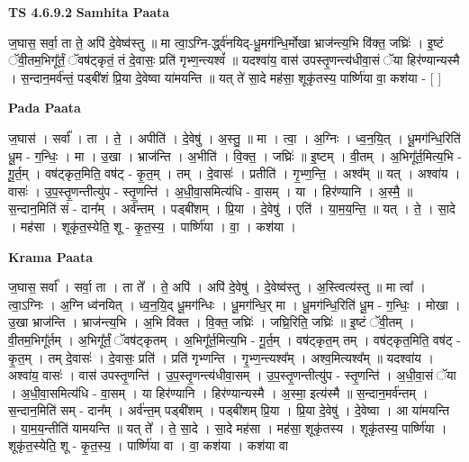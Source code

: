 \documentclass[17pt]{extarticle}
\begin{document}
\textbf{TS 4.6.9.2 } \newline
\textbf{Samhita Paata} \newline

ज॒घास॒ सर्वा॒ ता ते॒ अपि॑ दे॒वेष्व॑स्तु ॥ मा त्वा॒ऽग्नि-र्द्ध्व॑नयिद्-धू॒मग॑न्धि॒र्मोखा भ्राज॑न्त्य॒भि वि॑क्त॒ जघ्रिः॑ । इ॒ष्टं ॅवी॒तम॒भिगू᳚र्तं॒ ॅवष॑ट्कृतं॒ तं दे॒वासः॒ प्रति॑ गृभ्ण॒न्त्यश्वं᳚ ॥ यदश्वा॑य॒ वास॑ उपस्तृ॒णन्त्य॑धीवा॒सं ॅया हिर॑ण्यान्यस्मै । स॒न्दान॒मर्व॑न्तं॒ पड्बी॑शं प्रि॒या दे॒वेष्वा या॑मयन्ति ॥ यत् ते॑ सा॒दे मह॑सा॒ शूकृ॑तस्य॒ पार्ष्णि॑या वा॒ कश॑या - [  ] \newline

\textbf{Pada Paata} \newline

ज॒घास॑ । सर्वा᳚ । ता । ते॒ । अपीति॑ । दे॒वेषु॑ । अ॒स्तु॒ ॥ मा । त्वा॒ । अ॒ग्निः । ध्व॒न॒यि॒त् । धू॒मग॑न्धि॒रिति॑ धू॒म - ग॒न्धिः॒ । मा । उ॒खा । भ्राज॑न्ति । अ॒भीति॑ । वि॒क्त॒ । जघ्रिः॑ ॥ इ॒ष्टम् । वी॒तम् । अ॒भिगू᳚र्त॒मित्य॒भि - गू॒र्त॒म् । वष॑ट्कृत॒मिति॒ वष॑ट् - कृ॒त॒म् । तम् । दे॒वासः॑ । प्रतीति॑ । गृ॒भ्ण॒न्ति॒ । अश्व᳚म् ॥ यत् । अश्वा॑य । वासः॑ । उ॒प॒स्तृ॒णन्तीत्यु॑प - स्तृ॒णन्ति॑ । अ॒धी॒वा॒समित्य॑धि - वा॒सम् । या । हिर॑ण्यानि । अ॒स्मै॒ ॥ स॒न्दान॒मिति॑ सं - दान᳚म् । अर्व॑न्तम् । पड्बी॑शम् । प्रि॒या । दे॒वेषु॑ । एति॑ । या॒म॒य॒न्ति॒ ॥ यत् । ते॒ । सा॒दे । मह॑सा । शूकृ॑त॒स्येति॒ शू - कृ॒त॒स्य॒ । पार्ष्णि॑या । वा॒ । कश॑या ।  \newline


\textbf{Krama Paata} \newline

ज॒घास॒ सर्वा᳚ । सर्वा॒ ता । ता ते᳚ । ते॒ अपि॑ । अपि॑ दे॒वेषु॑ । दे॒वेष्व॑स्तु । अ॒स्त्वित्य॑स्तु ॥ मा त्वा᳚ । त्वा॒ऽग्निः । अ॒ग्नि ध्व॑नयित् । ध्व॒न॒यि॒द् धू॒मग॑न्धिः । धू॒मग॑न्धि॒र् मा । धू॒मग॑न्धि॒रिति॑ धू॒म - ग॒न्धिः॒ । मोखा । उ॒खा भ्राज॑न्ति । भ्राज॑न्त्य॒भि । अ॒भि वि॑क्त । वि॒क्त॒ जघ्रिः॑ । जघ्रि॒रिति॒ जघ्रिः॑ ॥ इ॒ष्टं ॅवी॒तम् । वी॒तम॒भिगू᳚र्तम् । अ॒भिगू᳚र्तं॒ ॅवष॑ट्कृतम् । अ॒भिगू᳚र्त॒मित्य॒भि - गू॒र्त॒म् । वष॑ट्कृत॒म् तम् । वष॑ट्कृत॒मिति॒ वष॑ट् - कृ॒त॒म् । तम् दे॒वासः॑ । दे॒वासः॒ प्रति॑ । प्रति॑ गृभ्णन्ति । गृ॒भ्ण॒न्त्यश्व᳚म् । अश्व॒मित्यश्व᳚म् ॥ यदश्वा॑य । अश्वा॑य॒ वासः॑ । वास॑ उपस्तृ॒णन्ति॑ । उ॒प॒स्तृ॒णन्त्य॑धीवा॒सम् । उ॒प॒स्तृ॒णन्तीत्यु॑प - स्तृ॒णन्ति॑ । अ॒धी॒वा॒सं ॅया । अ॒धी॒वा॒समित्य॑धि - वा॒सम् । या हिर॑ण्यानि । हिर॑ण्यान्यस्मै । अ॒स्मा॒ इत्य॑स्मै ॥ स॒न्दान॒मर्व॑न्तम् । स॒न्दान॒मिति॑ सम् - दान᳚म् । अर्व॑न्त॒म् पड्बी॑शम् । पड्बी॑शम् प्रि॒या । प्रि॒या दे॒वेषु॑ । दे॒वेष्वा । आ या॑मयन्ति । या॒म॒य॒न्तीति॑ यामयन्ति ॥ यत् ते᳚ । ते॒ सा॒दे । सा॒दे मह॑सा । मह॑सा॒ शूकृ॑तस्य । शूकृ॑तस्य॒ पार्ष्णि॑या । शूकृ॑त॒स्येति॒ शू - कृ॒त॒स्य॒ । पार्ष्णि॑या वा । वा॒ कश॑या । कश॑या वा \newline
\end{document}
